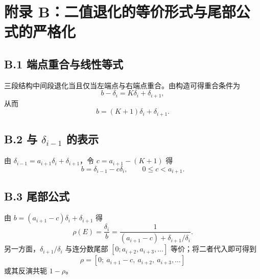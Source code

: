 \section{附录 B：二值退化的等价形式与尾部公式的严格化}

\subsection*{B.1 端点重合与线性等式}

三段结构中间段退化当且仅当左端点与右端点重合。由构造可得重合条件为
\[
b-\delta_i=K\delta_i+\delta_{i+1},
\]
从而
\[
b=(K+1)\delta_i+\delta_{i+1}.
\]

\subsection*{B.2 与 $\delta_{i-1}$ 的表示}

由 $\delta_{i-1}=a_{i+1}\delta_i+\delta_{i+1}$，令 $c=a_{i+1}-(K+1)$ 得
\[
b=\delta_{i-1}-c\delta_i,\qquad 0\le c<a_{i+1}.
\]

\subsection*{B.3 尾部公式}

由 $b=(a_{i+1}-c)\delta_i+\delta_{i+1}$ 得
\[
\rho(E)=\frac{\delta_i}{b}=\frac{1}{(a_{i+1}-c)+\delta_{i+1}/\delta_i}.
\]
另一方面，$\delta_{i+1}/\delta_i$ 与连分数尾部 $[0;a_{i+2},a_{i+3},\dots]$ 等价；将二者代入即可得到
\[
\rho=[0;\ a_{i+1}-c,\ a_{i+2},\ a_{i+3},\dots]
\]
或其反演共轭 $1-\rho$。

